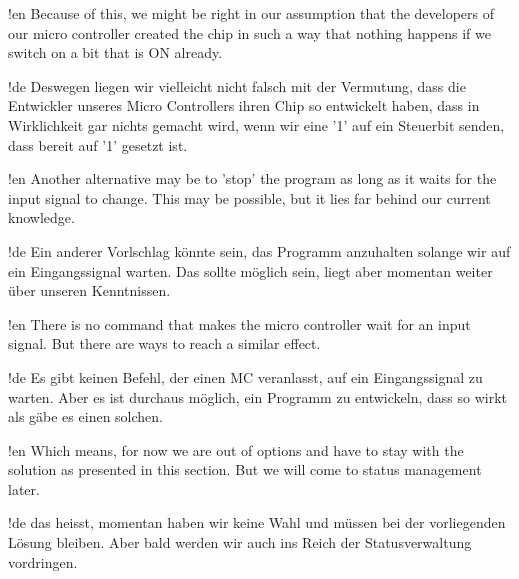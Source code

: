 !en Because of this, we might be right in our assumption that the developers of our \at{} micro controller created the chip in such a way that nothing happens if we switch on a bit that is ON already.

!de Deswegen liegen wir vielleicht nicht falsch mit der Vermutung, dass die Entwickler unseres \at{} Micro Controllers ihren Chip so entwickelt haben, dass in Wirklichkeit gar nichts gemacht wird, wenn wir eine '1' auf ein Steuerbit senden, dass bereit auf '1' gesetzt ist.



!en Another alternative may be to 'stop' the program as long as it waits for the input signal to change. This may be possible, but it lies far behind our current knowledge.

!de Ein anderer Vorlschlag könnte sein, das Programm anzuhalten solange wir auf ein Eingangssignal warten. Das sollte möglich sein, liegt aber momentan weiter über unseren Kenntnissen.



!en There is no command that makes the micro controller wait for an input signal. But there are ways to reach a similar effect.

!de Es gibt keinen Befehl, der einen MC veranlasst, auf ein Eingangssignal zu warten. Aber es ist durchaus möglich, ein Programm zu entwickeln, dass so wirkt als gäbe es einen solchen.



!en Which means, for now we are out of options and have to stay with the solution as presented in this section. But we will come to status management later.

!de das heisst, momentan haben wir keine Wahl und müssen bei der vorliegenden Lösung bleiben. Aber bald werden wir auch ins Reich der Statusverwaltung vordringen.
